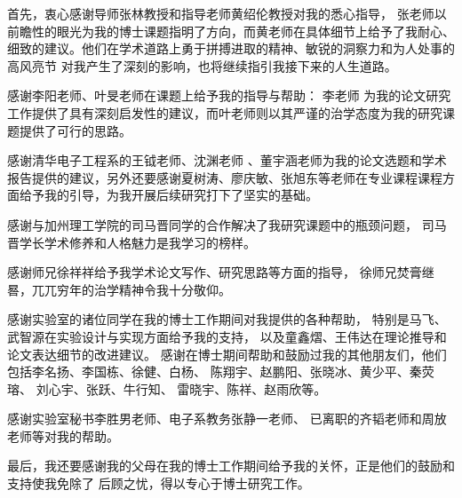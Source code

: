
\begin{acknowledgements}
  首先，衷心感谢导师张林教授和指导老师黄绍伦教授对我的悉心指导，
  张老师以前瞻性的眼光为我的博士课题指明了方向，而黄老师在具体细节上给予了我耐心、
  细致的建议。他们在学术道路上勇于拼搏进取的精神、敏锐的洞察力和为人处事的高风亮节
  对我产生了深刻的影响，也将继续指引我接下来的人生道路。

  感谢李阳老师、叶旻老师在课题上给予我的指导与帮助：
  李老师 为我的论文研究工作提供了具有深刻启发性的建议，而叶老师则以其严谨的治学态度为我的研究课题提供了可行的思路。

 感谢清华电子工程系的王钺老师、沈渊老师 、董宇涵老师为我的论文选题和学术报告提供的建议，另外还要感谢夏树涛、廖庆敏、张旭东等老师在专业课程课程方面给予我的引导，为我开展后续研究打下了坚实的基础。
 
 感谢与加州理工学院的司马晋同学的合作解决了我研究课题中的瓶颈问题，
 司马晋学长学术修养和人格魅力是我学习的榜样。
 
 感谢师兄徐祥祥给予我学术论文写作、研究思路等方面的指导，
 徐师兄焚膏继晷，兀兀穷年的治学精神令我十分敬仰。
 
感谢实验室的诸位同学在我的博士工作期间对我提供的各种帮助，
特别是马飞、武智源在实验设计与实现方面给予我的支持，
以及童鑫熠、王伟达在理论推导和论文表达细节的改进建议。
感谢在博士期间帮助和鼓励过我的其他朋友们，他们包括李名扬、李国栋、徐健、白杨、
陈翔宇、赵鹏阳、张晓冰、黄少平、秦荧瑢、
刘心宇、张跃、牛行知、
雷晓宇、陈祥、赵雨欣等。

感谢实验室秘书李胜男老师、电子系教务张静一老师、
已离职的齐韬老师和周放老师等对我的帮助。

最后，我还要感谢我的父母在我的博士工作期间给予我的关怀，正是他们的鼓励和支持使我免除了
后顾之忧，得以专心于博士研究工作。
\end{acknowledgements}
